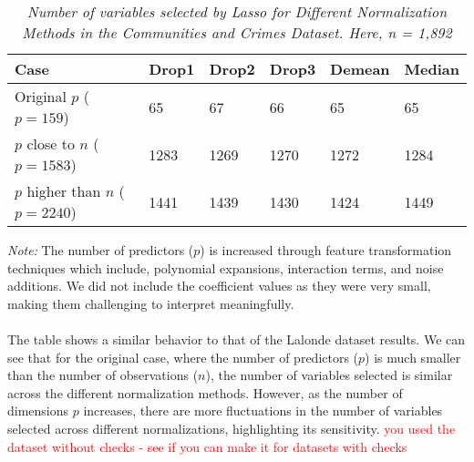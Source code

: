 \begin{table}[h!]
\renewcommand{\arraystretch}{1.5}
\centering
\begin{tabular}{||l l l l l l||} 
 \hline
 \hline
 Case & Drop1 & Drop2 & Drop3 & Demean & Median \\ [0.5ex] 
 \hline\hline 
 Original $p$ ($p = 159$) & 65 & 67 & 66 & 65 & 65 \\ 
 $p$ close to $n$ ($p = 1583$) & 1283 & 1269 & 1270 & 1272 & 1284 \\
 $p$ higher than $n$ ($p= 2240$) & 1441 & 1439 & 1430 & 1424 & 1449 \\ [1ex] 
 \hline
\end{tabular}
\caption{\textit{Number of variables selected by Lasso for Different Normalization Methods in the Communities and Crimes Dataset. Here, n = 1,892 }}
\label{table:1}
\end{table}

\textit{Note:} The number of predictors ($p$) is increased through feature transformation techniques which include, polynomial expansions, interaction terms, and noise additions. We did not include the coefficient values as they were very small, making them challenging to interpret meaningfully. \\
\\
The table shows a similar behavior to that of the Lalonde dataset results. We can see that for the original case, where the number of predictors ($p$) is much smaller than the number of observations ($n$), the number of variables selected is similar across the different normalization methods. However, as the number of dimensions $p$ increases, there are more fluctuations in the number of variables selected across different normalizations, highlighting its sensitivity. 
\textcolor{red}{you used the dataset without checks - see if you can make it for datasets with checks}




